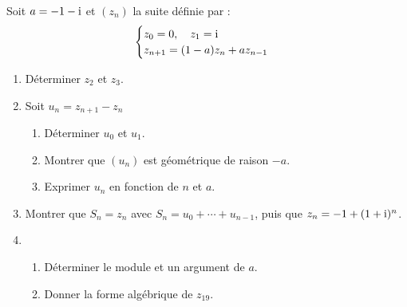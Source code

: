 \begin{exercice}
Soit $a = -1 - \text{i}$ et $(z_n)$ la suite d\'efinie par :
\[\begin{cases} z_0 = 0, \quad z_1 = \text{i} \\ z_{n+1} = (1-a)z_n + az_{n-1} \end{cases}\]
\begin{enumerate}
  \item D\'eterminer $z_2$ et $z_3$.
  \item Soit $u_n = z_{n+1} - z_n$
    \begin{enumerate}
      \item D\'eterminer $u_0$ et $u_1$.
      \item Montrer que $(u_n)$ est g\'eom\'etrique de raison $-a$.
      \item Exprimer $u_n$ en fonction de $n$ et $a$.
    \end{enumerate}
  \item Montrer que $S_n = z_n$ avec $S_n = u_0 + \cdots + u_{n-1}$, puis que $z_n = -1 + (1+\text{i})^n$.
  \item
    \begin{enumerate}
      \item D\'eterminer le module et un argument de $a$.
      \item Donner la forme alg\'ebrique de $z_{19}$.
    \end{enumerate}
\end{enumerate}
\end{exercice}

